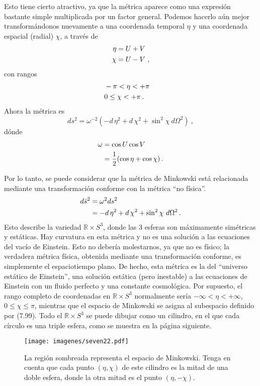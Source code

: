 \documentclass[11pt,b5paper,openany,twoside]{book}
\newcommand{\R}{\mathbb{R}}
\begin{document}
Esto tiene cierto atractivo, ya que la métrica aparece como una expresión bastante simple multiplicada por un factor general.
Podemos hacerlo aún mejor transformándonos nuevamente a una coordenada temporal $\eta$ y una coordenada espacial (radial) $\chi$, a través de
\begin{align}
\eta  &=  U+V \notag \\  \chi  &=  U-V\ ,\label{7.98}
\end{align}
con rangos
\begin{align}
& -\pi< \eta < +\pi &  \notag \\  & 0 \leq \chi < +\pi\,. &
\label{7.99}
\end{align}
Ahora la métrica es
\begin{equation}
ds^2 = \omega^{-2}\left(- d\,\eta^2 +  d\,\chi^2 +\sin^2\chi\
d\Omega^2\right)\ ,\label{7.100}
\end{equation}
dónde
\begin{align}
\omega  &=  \cos U \cos V \notag \\   &=  {1\over 2}
(\cos\eta +\cos\chi)\,.\label{7.101}
\end{align}

Por lo tanto, se puede considerar que la métrica de Minkowski está relacionada mediante una transformación conforme con la métrica ``no física''.
\begin{align}
d\bar{s}^2  &=  \omega^2 ds^2 \notag \\
&=  - d\,\eta^2 +  d\,\chi^2 +\sin^2\chi\ d\Omega^2\,.\label{7.102}
\end{align}
Esto describe la variedad $\R\times S^3$, donde las 3 esferas son máximamente simétricas y estáticas.
Hay curvatura en esta métrica y no es una solución a las ecuaciones del vacío de Einstein.
Esto no debería molestarnos, ya que no es físico; la verdadera métrica física, obtenida mediante una transformación conforme, es simplemente el espaciotiempo plano.
De hecho, esta métrica es la del ``universo estático de Einstein'', una solución estática (pero inestable) a las ecuaciones de Einstein con un fluido perfecto y una constante cosmológica.
Por supuesto, el rango completo de coordenadas en $\R\times S^3$ normalmente sería $-\infty < \eta < +\infty$, $0\leq\chi \leq\pi$, mientras que el espacio de Minkowski se asigna al subespacio definido por (7.99).
Todo el $\R\times S^3$ se puede dibujar como un cilindro, en el que cada círculo es una triple esfera, como se muestra en la página siguiente.

\begin{figure}[h]
\centering
\texttt{[image: imagenes/seven22.pdf]}
\caption{La región sombreada representa el espacio de Minkowski. Tenga en cuenta que cada punto $(\eta,\chi)$ de este cilindro es la mitad de una doble esfera, donde la otra mitad es el punto $(\eta,-\chi)$. }
\end{figure}
\end{document}
